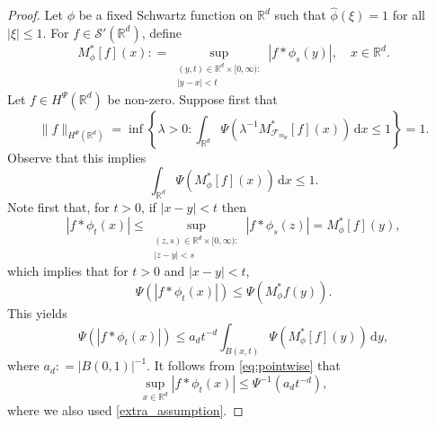 \documentclass[a4paper, leqno, 10pt]{amsart}
\numberwithin{equation}{section}
\newcommand{\dd}{\mathrm{d}}
\newcommand{\R}{\mathbb{R}}
\newcommand{\brkt}[1]{\left(#1\right)}
\newcommand{\abs}[1]{\left|#1\right|}
\begin{document}
\begin{proof} Let $\phi $ be a fixed Schwartz function on $\R^d$ such that $\widehat{\phi} (\xi) = 1$ for all $\abs{\xi } \leq 1$. 
For $f \in \mathcal{S}' (\R^d)$, define
\[
M_{\phi}^{\ast} [f] (x) : =  \sup_{\substack{ (y,t) \in \R^d \times [0, \infty):\\
 \abs{y-x}< t }} \abs{f \ast \phi_s (y)} , \quad x \in \R^d . 
\]
Let $f \in H^{\Psi} (\R^d)$ be non-zero. Suppose first that
\[
\| f \|_{H^{\Psi} (\R^d)} = \inf \left\{ \lambda >0 : \int_{\R^d} \Psi \brkt{\lambda^{-1} M_{ \mathcal{F}_{m_{\Psi}}}^{\ast} [f] (x)} \, \dd x \leq 1 \right\} = 1. 
\]
Observe that this implies 
\begin{equation}\label{extra_assumption}
\int_{\R^d} \Psi \brkt{  M_{\phi}^{\ast} [f] (x)} \, \dd x \leq 1. 
\end{equation}
Note first that, for $t>0$, if $\abs{x-y}<t$ then
\[	\abs{f \ast \phi_t (x)}\leq \sup_{\substack{ (z,s) \in \R^d \times [0, \infty):\\
 \abs{z-y}<s }} \abs{f \ast \phi_s (z)} = M_{\phi}^{\ast} [f] (y), 
\]
which implies that for $t>0$ and $\abs{x-y}<t$,
\[
\Psi \brkt{\abs{f*\phi_t(x)}}\leq \Psi \brkt{M^*_{\phi}f(y)}. 
\]
This yields
\begin{equation}\label{eq:pointwise}
\Psi \brkt{\abs{f*\phi_t(x)}}\leq a_dt^{-d}\int_{B(x,t)} \Psi \brkt{M^*_{\phi}[f](y)} \, \dd y,
\end{equation}
where $a_d : =\abs{B(0,1)}^{-1}$. It follows from \eqref{eq:pointwise}   that   
\begin{equation}\label{eq:pointwise_2}
\sup_{x \in \R^d}{\abs{f \ast \phi_t (x)}}\leq \Psi^{-1}\brkt{a_d t^{-d} },
\end{equation}
where we also used \eqref{extra_assumption}. 
	

\end{proof}
\end{document}
